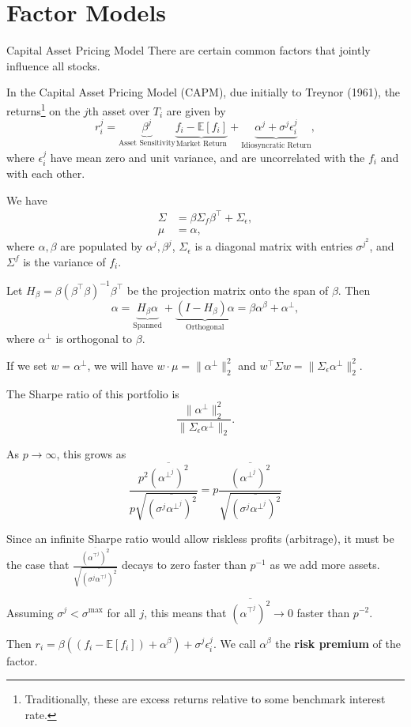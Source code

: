 \documentclass{beamer}
\begin{document}
\section{Factor Models}
\begin{frame}{Capital Asset Pricing Model}
	There are certain common factors that jointly influence all stocks.

	In the Capital Asset Pricing Model (CAPM), due initially to Treynor (1961), the returns\footnote{Traditionally, these are excess returns relative to some benchmark interest rate.} on the $j$th asset over $T_i$ are given by
	$$r_i^j = \underbrace{\beta^j}_{\textrm{Asset Sensitivity}} \underbrace{f_i-\mathbb{E}[f_i]}_{\textrm{Market Return}} + \underbrace{\alpha^j + \sigma^j\epsilon_i^j}_{\textrm{Idiosyncratic Return}},$$ 
	where $\epsilon_i^j$ have mean zero and unit variance, and are uncorrelated with the $f_i$ and with each other.

	We have
	\begin{align*}
		\Sigma	&= \beta \Sigma_f \beta^\top + \Sigma_\epsilon,
	\\	\mu	&= \alpha,
	\end{align*}
	where $\alpha,\beta$ are populated by $\alpha^j,\beta^j$, $\Sigma_\epsilon$ is a diagonal matrix with entries $\sigma^j^2$, and $\Sigma^f$ is the variance of $f_i$.

	Let $H_\beta=\beta (\beta^\top \beta)^{-1}\beta^\top$ be the projection matrix onto the span of $\beta$. Then
	$$\alpha = \underbrace{H_\beta\alpha}_{\textrm{Spanned}} + \underbrace{(I-H_\beta) \alpha}_{\textrm{Orthogonal}} = \beta \alpha^\beta + \alpha^\bot,$$
	where $\alpha^\bot$ is orthogonal to $\beta$.

	If we set $w = \alpha^\bot$, we will have $w\cdot\mu = \|\alpha^\bot\|_2^2$ and $w^\top\Sigma w = \|\Sigma_\epsilon \alpha^\bot\|_2^2$.

	The Sharpe ratio of this portfolio is
	$$\frac{\|\alpha^\bot\|_2^2}{\|\Sigma_\epsilon\alpha^\bot\|_2}.$$

	As $p\to\infty$, this grows as
	$$\frac{p^2 \overline{(\alpha^\bot^j)^2}}{p \sqrt{\overline{(\sigma^j \alpha^\bot^j)^2}}} = p \frac{\overline{(\alpha^\bot^j)^2}}{\sqrt{\overline{(\sigma^j \alpha^\bot^j)^2}}} $$

	Since an infinite Sharpe ratio would allow riskless profits (arbitrage), it must be the case that $\frac{\overline{(\alpha^\top^j)^2}}{\sqrt{\overline{(\sigma^j\alpha^\top^j)^2}}}$ decays to zero faster than $p^{-1}$ as we add more assets.

	Assuming $\sigma^j<\sigma^{\max}$ for all $j$, this means that $\overline{(\alpha^\top^j)^2}\to 0$ faster than $p^{-2}$.

	Then $r_i = \beta ((f_i-\mathbb{E}[f_i]) + \alpha^\beta) + \sigma^j\epsilon_i^j$. We call $\alpha^\beta$ the \textbf{risk premium} of the factor.

\end{frame}
\end{document}
